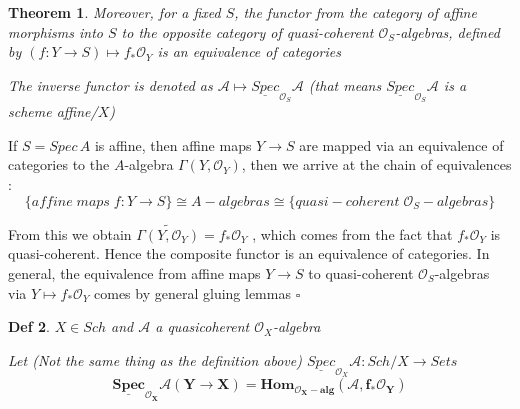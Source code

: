 \documentclass{article}
\newtheorem{theorem}{Theorem}[section]
\newtheorem{definition}[theorem]{Def}
\newenvironment{Proof}{{\noindent \indent \it Proof:\quad}}{\hfill $\square$\par}
\begin{document}
\begin{theorem}
    Moreover, for a fixed $S$, the functor from the category of affine morphisms into $S$ to the opposite category of quasi-coherent $\mathcal O_S$-algebras, defined by $(f : Y \to S) \mapsto f_\ast\mathcal O_Y$ is an equivalence of
categories

The inverse functor is denoted as $\mathcal A \mapsto \underline{Spec}_{\mathcal O_S}\mathcal A$ (that means $\underline{Spec}_{\mathcal O_S}\mathcal A$ is a scheme affine/$X$)
\end{theorem}
\begin{Proof}
If $S = Spec\, A$ is affine, then affine maps $Y \to S$ are mapped via an equivalence of categories to
the $A$-algebra $\Gamma(Y,\mathcal O_Y )$, then we arrive at the chain of equivalences :
$$
\{ affine\; maps\; f : Y \to S\} \cong {A-algebras} \cong \{quasi-coherent\;\mathcal O_S-algebras\}
$$

From this we obtain $\widetilde{\Gamma(Y, \mathcal O_Y)} = f_\ast\mathcal O_Y$ , which comes from the fact that $f_\ast\mathcal O_Y$ is quasi-coherent. Hence the composite functor is an equivalence of categories. In general, the equivalence from affine maps
$Y \to S$ to quasi-coherent $\mathcal O_S$-algebras via $Y \mapsto f_\ast\mathcal O_Y$ comes by general gluing lemmas
\end{Proof}

\begin{definition}
$X\in Sch$ and $\mathcal A$ a quasicoherent $\mathcal O_X$-algebra

Let (Not the same thing as the definition above) $\underline{Spec}_{\mathcal O_X}\mathcal A : Sch/X\to Sets$
$$
\bm{
\underline{Spec}_{\mathcal O_X}\mathcal A(Y\to X)=Hom_{\mathcal O_X-alg}(\mathcal A,f_\ast\mathcal O_Y)
}
$$
\end{definition}
\end{document}
